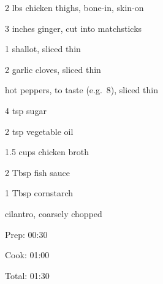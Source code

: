 \documentclass[oneside]{book}  %
\newcommand{\itemNL}{\item[] \hspace{-\labelsep}}  %
\begin{document}
\begin{IT}
  \begin{ingredients}
    \item[2 lbs] chicken thighs, bone-in, skin-on
    \item[3 inches] ginger, cut into matchsticks
    \item[1] shallot, sliced thin
    \item[2] garlic cloves, sliced thin
    \itemNL hot peppers, to taste (e.g.\ 8), sliced thin
    \item[4 tsp] sugar
    \item[2 tsp] vegetable oil
    \item[1.5 cups] chicken broth
    \item[2 Tbsp] fish sauce
    \item[1 Tbsp] cornstarch
    \itemNL cilantro, coarsely chopped
  \end{ingredients}

  \switchcolumn

  \begin{timeline}
    \item[Prep:]  00:30
    \item[Cook:]  01:00
    \item[Total:] 01:30
  \end{timeline}
\end{IT}
\end{document}
